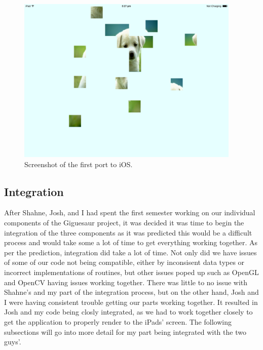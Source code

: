 \documentclass{article}
\begin{document}
\begin{figure}[ht]
\begin{center}
\includegraphics[width=0.95\textwidth]{images/iPadPortImage}
\caption{Screenshot of the first port to iOS.}
\label{fig:iPadPort}
\end{center}
\end{figure}

\subsection{Integration}
After Shahne, Josh, and I had spent the first semester working on our individual
components of the Giguesaur project, it was decided it was time to begin the
integration of the three components as it was predicted this would be a
difficult process and would take some a lot of time to get everything working
together. As per the prediction, integration did take a lot of time. Not only
did we have issues of some of our code not being compatible, either by
inconsisent data types or incorrect implementations of routines, but other
issues poped up such as OpenGL and OpenCV having issues working together. There
was little to no issue with Shahne's and my part of the integration process, but
on the other hand, Josh and I were having consistent trouble getting our parts
working together. It resulted in Josh and my code being closly integrated, as we
had to work together closely to get the application to properly render to the
iPads' screen. The following subsections will go into more detail for my part
being integrated with the two guys'.
\end{document}
